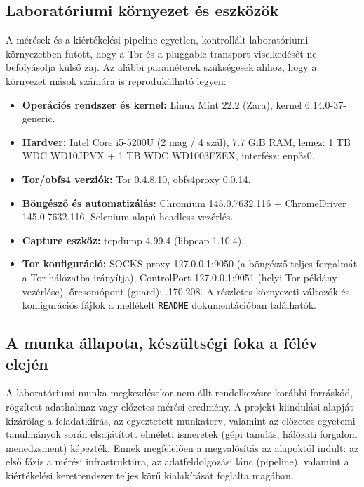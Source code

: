 \documentclass[a4paper,oneside]{article}
\begin{document}
\subsection{Laboratóriumi környezet és eszközök}
A mérések és a kiértékelési pipeline egyetlen, kontrollált
laboratóriumi környezetben futott, hogy a Tor és a pluggable transport
viselkedését ne befolyásolja külső zaj.
Az alábbi paraméterek szükségesek
ahhoz, hogy a környezet mások számára is reprodukálható legyen:
\begin{itemize}
    \item \textbf{Operációs rendszer és kernel:} Linux Mint 22.2 (Zara), kernel 6.14.0-37-generic.
\item \textbf{Hardver:} Intel Core i5-5200U (2 mag / 4 szál), 7.7 GiB RAM, lemez: 1 TB WDC WD10JPVX + 1 TB WDC WD1003FZEX, interfész: enp3s0.
\item \textbf{Tor/obfs4 verziók:} Tor 0.4.8.10, obfs4proxy 0.0.14.
    \item \textbf{Böngésző és automatizálás:} Chromium 145.0.7632.116 + ChromeDriver 145.0.7632.116, Selenium alapú headless vezérlés.
\item \textbf{Capture eszköz:} tcpdump 4.99.4 (libpcap 1.10.4).
    \item \textbf{Tor konfiguráció:} SOCKS proxy 127.0.0.1:9050 (a böngésző teljes forgalmát a Tor hálózatba irányítja), ControlPort 127.0.0.1:9051 (helyi Tor példány vezérlése), őrcsomópont (guard): .170.208. A részletes környezeti változók és konfigurációs fájlok a mellékelt \texttt{README} dokumentációban találhatók.
\end{itemize}

\subsection{A munka állapota, készültségi foka a félév elején}
\label{sec:munka-allap-kesz}

A laboratóriumi munka megkezdésekor nem állt rendelkezésre korábbi forráskód, rögzített adathalmaz vagy előzetes mérési eredmény.
A projekt kiindulási alapját kizárólag a feladatkiírás, az egyeztetett munkaterv, valamint az előzetes egyetemi tanulmányok során elsajátított elméleti ismeretek (gépi tanulás, hálózati forgalom menedzsment) képezték.
Ennek megfelelően a megvalósítás az alapoktól indult: az első fázis a mérési infrastruktúra, az adatfeldolgozási lánc (pipeline), valamint a kiértékelési keretrendszer teljes körű kialakítását foglalta magában.
\end{document}
